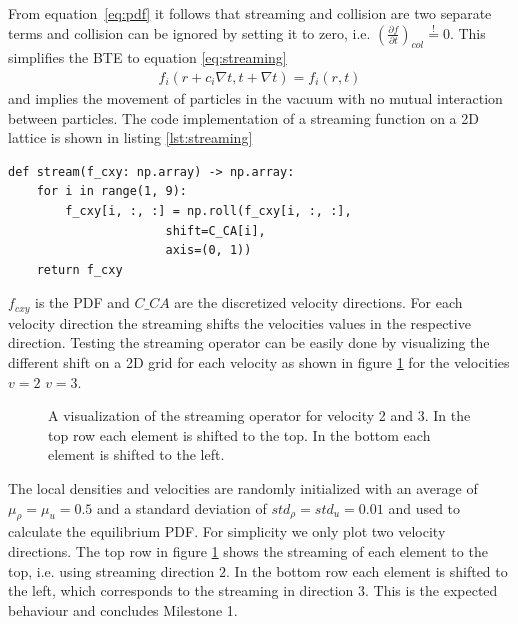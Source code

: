 From equation~\ref{eq:pdf} it follows that streaming and collision are two separate terms and collision can be ignored by setting it to zero, i.e. $\left( \frac{\partial f}{\partial t} \right)_{col} \overset{!}{=} 0$.
This simplifies the BTE to equation \ref{eq:streaming} 
\begin{equation}
  \label{eq:streaming}
  \begin{aligned}
    f_{i}(r+c_{i} \nabla t,t+\nabla t)=f_{i}(r,t)
  \end{aligned}
\end{equation}
and implies the movement of particles in the vacuum with no mutual interaction between particles.
The code implementation of a streaming function on a 2D lattice is shown in listing \ref{lst:streaming}
\begin{center}
\begin{lstlisting}[caption=Implementation of the streaming operator,label=lst:streaming, basicstyle=\small]
def stream(f_cxy: np.array) -> np.array:
    for i in range(1, 9):
        f_cxy[i, :, :] = np.roll(f_cxy[i, :, :], 
                      shift=C_CA[i], 
                      axis=(0, 1))
    return f_cxy
  \end{lstlisting}
\end{center}
$f_{cxy}$ is the PDF and $C \_ CA$ are the discretized velocity directions.
For each velocity direction the streaming shifts the velocities values in the respective direction.
Testing the streaming operator can be easily done by visualizing the different shift on a 2D grid for each velocity as shown in figure \ref{fig:m1-shifting} for the velocities $v=2$ $v=3$.
\begin{figure}[ht]
\centering
\resizebox{\columnwidth}{!}{\large}
\vspace*{-10mm}
\caption[Visualization of the streaming]{A visualization of the streaming operator for velocity 2 and 3. In the top row each element is shifted to the top. In the bottom  each element is shifted to the left.}
\label{fig:m1-shifting}
\end{figure}
The local densities and velocities are randomly initialized with an average of $\mu_{\rho}=\mu_{u}=0.5$ and a standard deviation of $std_{\rho}=std_{u}=0.01$ and used to calculate the equilibrium PDF.
For simplicity we only plot two velocity directions.
The top row in figure \ref{fig:m1-shifting} shows the streaming of each element to the top, i.e. using streaming direction $2$. In the bottom row each element is shifted to the left, which corresponds to the streaming in direction $3$.
This is the expected behaviour and concludes Milestone 1.

